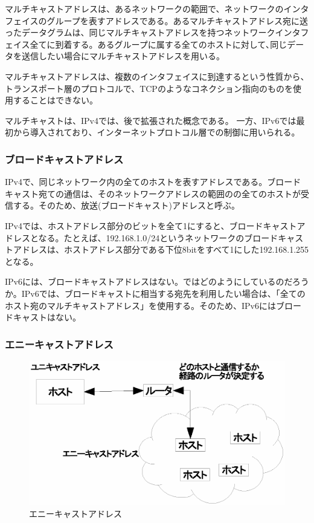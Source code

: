 マルチキャストアドレスは、あるネットワークの範囲で、ネットワークのインタフェイスのグループを表すアドレスである。あるマルチキャストアドレス宛に送ったデータグラムは、同じマルチキャストアドレスを持つネットワークインタフェイス全てに到着する。あるグループに属する全てのホストに対して､同じデータを送信したい場合にマルチキャストアドレスを用いる。

マルチキャストアドレスは、複数のインタフェイスに到達するという性質から、トランスポート層のプロトコルで、TCPのようなコネクション指向のものを使用することはできない。

マルチキャストは、IPv4では、後で拡張された概念である。
一方、IPv6では最初から導入されており、インターネットプロトコル層での制御に用いられる。

\subsubsection{ブロードキャストアドレス}
IPv4で、同じネットワーク内の全てのホストを表すアドレスである。ブロードキャスト宛ての通信は、そのネットワークアドレスの範囲のの全てのホストが受信する。そのため、放送(ブロードキャスト)アドレスと呼ぶ。

IPv4では、ホストアドレス部分のビットを全て1にすると、ブロードキャストアドレスとなる。たとえば、192.168.1.0/24というネットワークのブロードキャストアドレスは、ホストアドレス部分である下位8bitをすべて1にした192.168.1.255となる。

IPv6には、ブロードキャストアドレスはない。ではどのようにしているのだろうか。IPv6では、ブロードキャストに相当する宛先を利用したい場合は、「全てのホスト宛のマルチキャストアドレス」を使用する。そのため、IPv6にはブロードキャストはない。

\subsubsection{エニーキャストアドレス}

\begin{figure}[htbp]
	\includegraphics[width=12cm,clip]{draw/anycast.eps}
	\caption{エニーキャストアドレス}
	\label{fig:anycast}
\end{figure}


